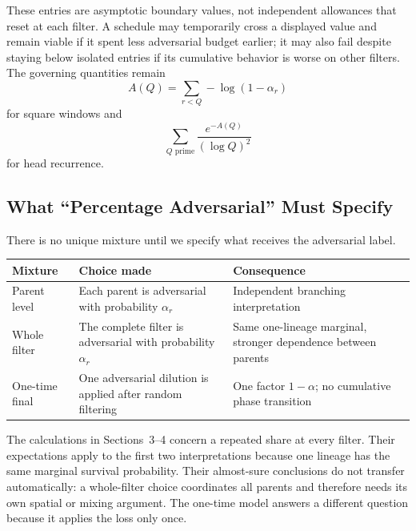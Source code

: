 These entries are asymptotic boundary values, not independent allowances that reset at each filter. A schedule may temporarily cross a displayed value and remain viable if it spent less adversarial budget earlier; it may also fail despite staying below isolated entries if its cumulative behavior is worse on other filters. The governing quantities remain
\begin{equation*}
A(Q)=\sum_{r < Q}-\log(1-\alpha_r)
\end{equation*}
for square windows and
\begin{equation*}
\sum_{Q\text{ prime}}
\frac{e^{-A(Q)}}{(\log Q)^2}
\end{equation*}
for head recurrence.
\subsection{What “Percentage Adversarial” Must Specify}
There is no unique mixture until we specify what receives the adversarial label.
\begin{longtable}{@{}>{\raggedright\arraybackslash}p{}>{\raggedright\arraybackslash}p{}>{\raggedright\arraybackslash}p{}@{}}
\toprule
Mixture & Choice made & Consequence \\
\midrule
Parent level & Each parent is adversarial with probability $\alpha_r$ & Independent branching interpretation \\
Whole filter & The complete filter is adversarial with probability $\alpha_r$ & Same one-lineage marginal, stronger dependence between parents \\
One-time final & One adversarial dilution is applied after random filtering & One factor $1-\alpha$; no cumulative phase transition \\
\bottomrule
\end{longtable}
The calculations in Sections~3--4 concern a repeated share at every filter. Their expectations apply to the first two interpretations because one lineage has the same marginal survival probability. Their almost-sure conclusions do not transfer automatically: a whole-filter choice coordinates all parents and therefore needs its own spatial or mixing argument. The one-time model answers a different question because it applies the loss only once.
